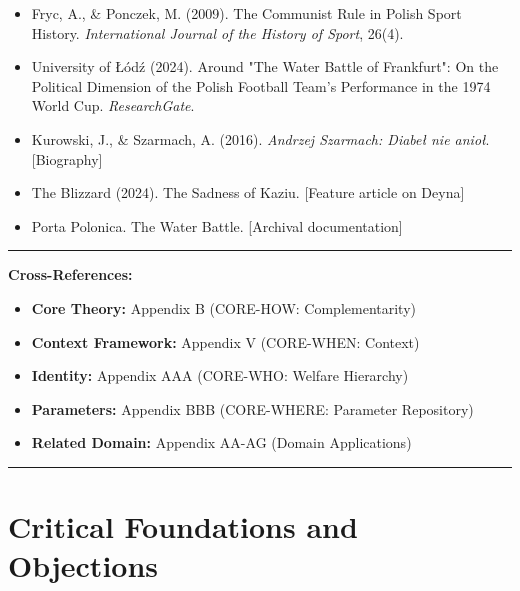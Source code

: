 \begin{itemize}
    \item Fryc, A., \& Ponczek, M. (2009). The Communist Rule in Polish Sport History.
    \textit{International Journal of the History of Sport}, 26(4).

    \item University of Łódź (2024). Around "The Water Battle of Frankfurt":
    On the Political Dimension of the Polish Football Team's Performance
    in the 1974 World Cup. \textit{ResearchGate}.

    \item Kurowski, J., \& Szarmach, A. (2016). \textit{Andrzej Szarmach:
    Diabeł nie anioł}. [Biography]

    \item The Blizzard (2024). The Sadness of Kaziu. [Feature article on Deyna]

    \item Porta Polonica. The Water Battle. [Archival documentation]
\end{itemize}



\vspace{2em}
\hrule
\vspace{1em}

\textbf{Cross-References:}
\begin{itemize}
    \item \textbf{Core Theory:} Appendix B (CORE-HOW: Complementarity)
    \item \textbf{Context Framework:} Appendix V (CORE-WHEN: Context)
    \item \textbf{Identity:} Appendix AAA (CORE-WHO: Welfare Hierarchy)
    \item \textbf{Parameters:} Appendix BBB (CORE-WHERE: Parameter Repository)
    \item \textbf{Related Domain:} Appendix AA-AG (Domain Applications)
\end{itemize}

\vspace{1em}
\hrule



\section{Critical Foundations and Objections}
\label{sec:bm-foundations}

